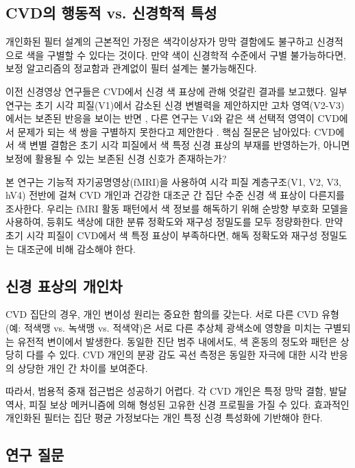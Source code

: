 \documentclass[12pt,a4paper]{article}
\begin{document}
\subsection{CVD의 행동적 vs. 신경학적 특성}

개인화된 필터 설계의 근본적인 가정은 색각이상자가 망막 결함에도 불구하고 신경적으로 색을 구별할 수 있다는 것이다. 만약 색이 신경학적 수준에서 구별 불가능하다면, 보정 알고리즘의 정교함과 관계없이 필터 설계는 불가능해진다.

이전 신경영상 연구들은 CVD에서 신경 색 표상에 관해 엇갈린 결과를 보고했다. 일부 연구는 초기 시각 피질(V1)에서 감소된 신경 변별력을 제안하지만 고차 영역(V2-V3)에서는 보존된 반응을 보이는 반면 \parencite{Tregillus2021}, 다른 연구는 V4와 같은 색 선택적 영역이 CVD에서 문제가 되는 색 쌍을 구별하지 못한다고 제안한다 \parencite{Neitz2011}. 핵심 질문은 남아있다: CVD에서 색 변별 결함은 초기 시각 피질에서 색 특정 신경 표상의 부재를 반영하는가, 아니면 보정에 활용될 수 있는 보존된 신경 신호가 존재하는가?

본 연구는 기능적 자기공명영상(fMRI)을 사용하여 시각 피질 계층구조(V1, V2, V3, hV4) 전반에 걸쳐 CVD 개인과 건강한 대조군 간 집단 수준 신경 색 표상이 다른지를 조사한다. 우리는 fMRI 활동 패턴에서 색 정보를 해독하기 위해 순방향 부호화 모델을 사용하여, 등휘도 색상에 대한 분류 정확도와 재구성 정밀도를 모두 정량화한다. 만약 초기 시각 피질이 CVD에서 색 특정 표상이 부족하다면, 해독 정확도와 재구성 정밀도는 대조군에 비해 감소해야 한다.

\subsection{신경 표상의 개인차}

CVD 집단의 경우, 개인 변이성 원리는 중요한 함의를 갖는다. 서로 다른 CVD 유형(예: 적색맹 vs. 녹색맹 vs. 적색약)은 서로 다른 추상체 광색소에 영향을 미치는 구별되는 유전적 변이에서 발생한다. 동일한 진단 범주 내에서도, 색 혼동의 정도와 패턴은 상당히 다를 수 있다. CVD 개인의 분광 감도 곡선 측정은 동일한 자극에 대한 시각 반응의 상당한 개인 간 차이를 보여준다.

따라서, 범용적 중재 접근법은 성공하기 어렵다. 각 CVD 개인은 특정 망막 결함, 발달 역사, 피질 보상 메커니즘에 의해 형성된 고유한 신경 프로필을 가질 수 있다. 효과적인 개인화된 필터는 집단 평균 가정보다는 개인 특정 신경 특성화에 기반해야 한다.

\subsection{연구 질문}
\end{document}
